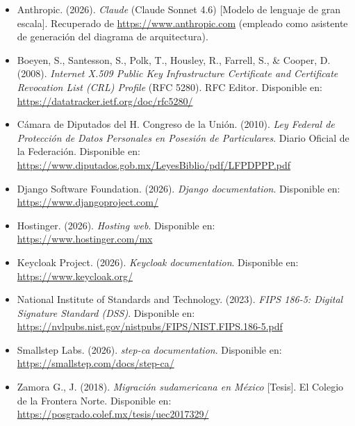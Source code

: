 \documentclass[10pt,letterpaper]{report}
\begin{document}
\begin{itemize}[leftmargin=*, label={}]
 
\item Anthropic. (2026). \textit{Claude} (Claude Sonnet 4.6) [Modelo de lenguaje de gran escala]. Recuperado de \url{https://www.anthropic.com} (empleado como asistente de generación del diagrama de arquitectura).

\item Boeyen, S., Santesson, S., Polk, T., Housley, R., Farrell, S., \& Cooper, D. (2008). \textit{Internet X.509 Public Key Infrastructure Certificate and Certificate Revocation List (CRL) Profile} (RFC 5280). RFC Editor. Disponible en: \url{https://datatracker.ietf.org/doc/rfc5280/}
 
\item Cámara de Diputados del H. Congreso de la Unión. (2010). \textit{Ley Federal de Protección de Datos Personales en Posesión de Particulares}. Diario Oficial de la Federación. Disponible en: \url{https://www.diputados.gob.mx/LeyesBiblio/pdf/LFPDPPP.pdf}
 
\item Django Software Foundation. (2026). \textit{Django documentation}. Disponible en: \url{https://www.djangoproject.com/}
 
 
\item Hostinger. (2026). \textit{Hosting web}. Disponible en: \url{https://www.hostinger.com/mx}
 
\item Keycloak Project. (2026). \textit{Keycloak documentation}. Disponible en: \url{https://www.keycloak.org/}
 
\item National Institute of Standards and Technology. (2023). \textit{FIPS 186-5: Digital Signature Standard (DSS)}. Disponible en: \url{https://nvlpubs.nist.gov/nistpubs/FIPS/NIST.FIPS.186-5.pdf}
 
\item Smallstep Labs. (2026). \textit{step-ca documentation}. Disponible en: \url{https://smallstep.com/docs/step-ca/}
 
\item Zamora G., J. (2018). \textit{Migración sudamericana en México} [Tesis]. El Colegio de la Frontera Norte. Disponible en: \url{https://posgrado.colef.mx/tesis/uec2017329/}
 
\end{itemize}
 
\end{document}
